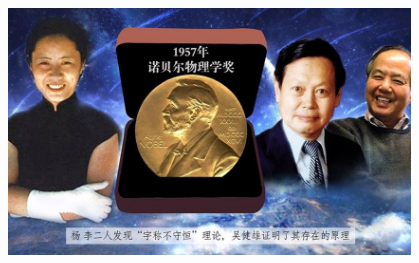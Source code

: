 \begin{frame}
    \includegraphics[width=0.8\textwidth]{figs/2021-12-18-00-23-17.png} \\
\end{frame} 





